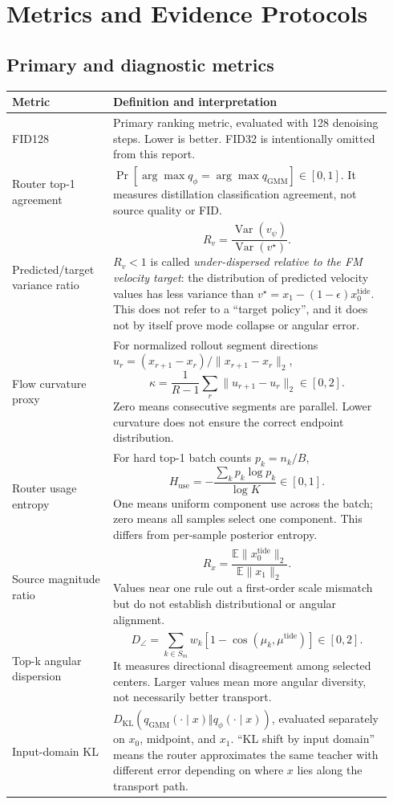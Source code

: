 \documentclass[11pt,a4paper]{article}
\newcommand{\kl}{D_{\mathrm{KL}}}
\begin{document}
\section{Metrics and Evidence Protocols}

\subsection{Primary and diagnostic metrics}

\begin{longtable}{@{}p{0.25\linewidth}p{0.69\linewidth}@{}}
\toprule
\textbf{Metric} & \textbf{Definition and interpretation}\\
\midrule
\endhead
FID128 &
Primary ranking metric, evaluated with 128 denoising steps. Lower is better.
FID32 is intentionally omitted from this report.\\
\addlinespace
Router top-1 agreement &
\(\Pr[\arg\max q_\phi=\arg\max q_{\mathrm{GMM}}]\in[0,1]\).
It measures distillation classification agreement, not source quality or FID.\\
\addlinespace
Predicted/target variance ratio &
\[
R_v=\frac{\operatorname{Var}(v_\psi)}
{\operatorname{Var}(v^\star)}.
\]
\(R_v<1\) is called \emph{under-dispersed relative to the FM velocity target}:
the distribution of predicted velocity values has less variance than
\(v^\star=x_1-(1-\epsilon)x_0^{\mathrm{tide}}\). This does not refer to a
``target policy'', and it does not by itself prove mode collapse or angular
error.\\
\addlinespace
Flow curvature proxy &
For normalized rollout segment directions
\(u_r=(x_{r+1}-x_r)/\|x_{r+1}-x_r\|_2\),
\[
\kappa=\frac1{R-1}\sum_r\|u_{r+1}-u_r\|_2\in[0,2].
\]
Zero means consecutive segments are parallel. Lower curvature does not ensure
the correct endpoint distribution.\\
\addlinespace
Router usage entropy &
For hard top-1 batch counts \(p_k=n_k/B\),
\[
H_{\mathrm{use}}=
-\frac{\sum_kp_k\log p_k}{\log K}\in[0,1].
\]
One means uniform component use across the batch; zero means all samples select
one component. This differs from per-sample posterior entropy.\\
\addlinespace
Source magnitude ratio &
\[
R_x=\frac{\mathbb E\|x_0^{\mathrm{tide}}\|_2}
{\mathbb E\|x_1\|_2}.
\]
Values near one rule out a first-order scale mismatch but do not establish
distributional or angular alignment.\\
\addlinespace
Top-k angular dispersion &
\[
D_\angle=
\sum_{k\in S_m}w_k\left[1-\cos(\mu_k,\mu^{\mathrm{tide}})\right]\in[0,2].
\]
It measures directional disagreement among selected centers. Larger values
mean more angular diversity, not necessarily better transport.\\
\addlinespace
Input-domain KL &
\(\kl(q_{\mathrm{GMM}}(\cdot\mid x)\Vert q_\phi(\cdot\mid x))\), evaluated
separately on \(x_0\), midpoint, and \(x_1\). ``KL shift by input domain''
means the router approximates the same teacher with different error depending
on where \(x\) lies along the transport path.\\
\bottomrule
\end{longtable}
\end{document}
